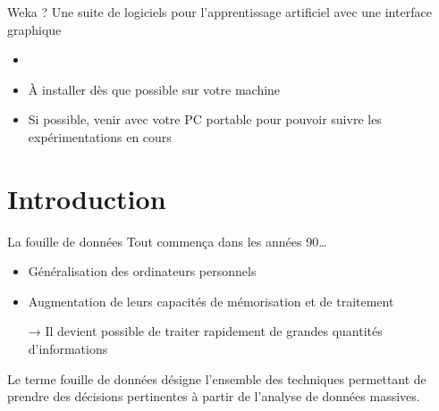 \documentclass[hyperref={unicode}, xcolor={svgnames}, french]{beamer}
\begin{document}
\begin{frame}{Weka ?}
    Une suite de logiciels pour l'apprentissage artificiel avec une interface graphique
    \begin{itemize}
        \item {}
        \item À installer dès que possible sur votre machine
        \item Si possible, venir avec votre PC portable pour pouvoir suivre les expérimentations en cours
    \end{itemize}
\end{frame}



\section*{Introduction}

\begin{frame}{La fouille de données}
    Tout commença dans les années 90…
    \begin{itemize}
        \item Généralisation des ordinateurs personnels
        \item Augmentation de leurs capacités de mémorisation et de traitement
        \item[→] Il devient possible de traiter rapidement de grandes quantités d'informations
    \end{itemize}
    Le terme \alert{fouille de données} désigne l'ensemble des techniques permettant de prendre des décisions pertinentes à partir de l'analyse de données massives.
\end{frame}
\end{document}
